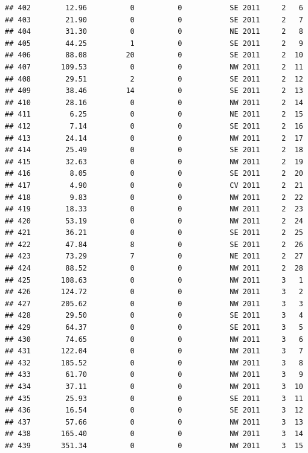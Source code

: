 \documentclass[
]{article}
\begin{document}
\begin{verbatim}
## 402        12.96          0          0           SE 2011     2   6
## 403        21.90          0          0           SE 2011     2   7
## 404        31.30          0          0           NE 2011     2   8
## 405        44.25          1          0           SE 2011     2   9
## 406        88.08         20          0           SE 2011     2  10
## 407       109.53          0          0           NW 2011     2  11
## 408        29.51          2          0           SE 2011     2  12
## 409        38.46         14          0           SE 2011     2  13
## 410        28.16          0          0           NW 2011     2  14
## 411         6.25          0          0           NE 2011     2  15
## 412         7.14          0          0           SE 2011     2  16
## 413        24.14          0          0           NW 2011     2  17
## 414        25.49          0          0           SE 2011     2  18
## 415        32.63          0          0           NW 2011     2  19
## 416         8.05          0          0           SE 2011     2  20
## 417         4.90          0          0           CV 2011     2  21
## 418         9.83          0          0           NW 2011     2  22
## 419        18.33          0          0           NW 2011     2  23
## 420        53.19          0          0           NW 2011     2  24
## 421        36.21          0          0           SE 2011     2  25
## 422        47.84          8          0           SE 2011     2  26
## 423        73.29          7          0           NE 2011     2  27
## 424        88.52          0          0           NW 2011     2  28
## 425       108.63          0          0           NW 2011     3   1
## 426       124.72          0          0           NW 2011     3   2
## 427       205.62          0          0           NW 2011     3   3
## 428        29.50          0          0           SE 2011     3   4
## 429        64.37          0          0           SE 2011     3   5
## 430        74.65          0          0           NW 2011     3   6
## 431       122.04          0          0           NW 2011     3   7
## 432       185.52          0          0           NW 2011     3   8
## 433        61.70          0          0           NW 2011     3   9
## 434        37.11          0          0           NW 2011     3  10
## 435        25.93          0          0           SE 2011     3  11
## 436        16.54          0          0           SE 2011     3  12
## 437        57.66          0          0           NW 2011     3  13
## 438       165.40          0          0           NW 2011     3  14
## 439       351.34          0          0           NW 2011     3  15

\end{verbatim}
\end{document}
